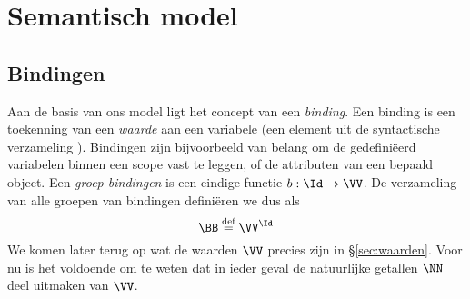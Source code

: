 \chapter{Semantisch model}

\section{Bindingen}\label{sec:bindinge}

Aan de basis van ons model ligt het concept van een \emph{binding}. Een binding is een toekenning van een \emph{waarde} aan een variabele (een element uit de syntactische verzameling \Id). Bindingen zijn bijvoorbeeld van belang om de gedefiniëerd variabelen binnen een scope vast te leggen, of de attributen van een bepaald object. Een \emph{groep bindingen} is een eindige functie $b : \Id \to \VV$. De verzameling van alle groepen van bindingen definiëren we dus als
\begin{equation*}
  \BB \DEF \VV^\Id
\end{equation*}
We komen later terug op wat de waarden $\VV$ precies zijn in §\ref{sec:waarden}. Voor nu is het voldoende om te weten dat in ieder geval de natuurlijke getallen $\NN$ deel uitmaken van $\VV$.



